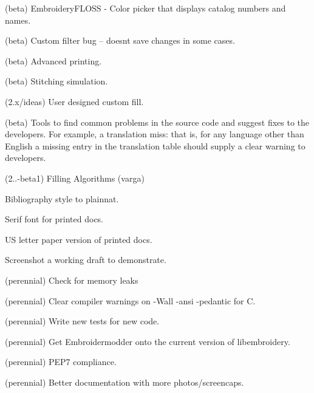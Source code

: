 \begin{DoxyRefList}
\label{todo__todo000391}%
%
(beta) Embroidery\+FLOSS -\/ Color picker that displays catalog numbers and names.

\label{todo__todo000392}%
%
(beta) Custom filter bug -- doesn\textquotesingle{}t save changes in some cases.

\label{todo__todo000393}%
%
(beta) Advanced printing.

\label{todo__todo000394}%
%
(beta) Stitching simulation.

\label{todo__todo000395}%
%
(2.\+x/ideas) User designed custom fill.

\label{todo__todo000377}%
%
(beta) Tools to find common problems in the source code and suggest fixes to the developers. For example, a translation miss\+: that is, for any language other than English a missing entry in the translation table should supply a clear warning to developers.

\label{todo__todo000258}%
%
(2..-\/beta1) Filling Algorithms (varga)

\label{todo__todo000233}%
%
Bibliography style to plainnat.

\label{todo__todo000234}%
%
Serif font for printed docs.

\label{todo__todo000235}%
%
US letter paper version of printed docs.

\label{todo__todo000236}%
%
Screenshot a working draft to demonstrate.

\label{todo__todo000237}%
%
(perennial) Check for memory leaks 



(perennial) Clear compiler warnings on {\ttfamily -\/Wall -\/ansi -\/pedantic} for C. 



(perennial) Write new tests for new code. 



(perennial) Get Embroidermodder onto the current version of libembroidery. 



(perennial) PEP7 compliance. 



(perennial) Better documentation with more photos/screencaps.


\end{DoxyRefList}
